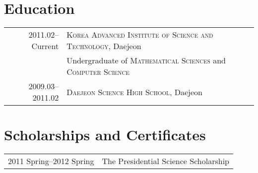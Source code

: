 \documentclass[a4paper,10pt]{article}
\begin{document}
\section{Education}
\begin{tabular}{rl}
  2011.02--Current & \textsc{Korea Advanced Institute of Science and Technology}, Daejeon \\
  & Undergraduate of \textsc{Mathematical Sciences} and \textsc{Computer Science} \\
  2009.03--2011.02 & \textsc{Daejeon Science High School}, Daejeon
\end{tabular}

\section{Scholarships and Certificates}
\begin{tabular}{rl}
  2011 Spring--2012 Spring & The Presidential Science Scholarship
\end{tabular}

\end{document}
